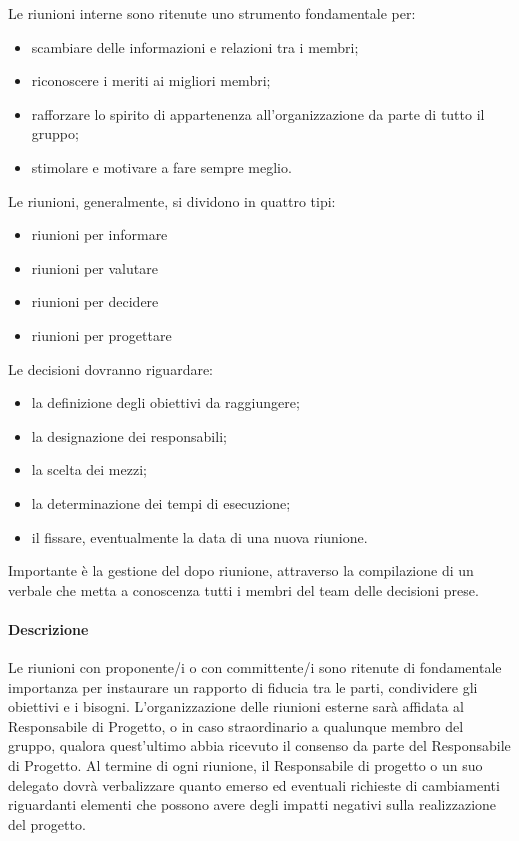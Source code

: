 Le riunioni interne sono ritenute uno strumento fondamentale per:
\begin{itemize}
\item
scambiare delle informazioni e relazioni tra i membri;
\item
riconoscere  i  meriti  ai  migliori membri;
\item
rafforzare lo spirito di appartenenza all'organizzazione da parte di tutto il gruppo;
\item
stimolare e motivare a fare sempre meglio.
\end{itemize}

Le riunioni, generalmente, si dividono in quattro tipi:
\begin{itemize}
\item
riunioni per informare
\item 
riunioni per valutare
\item
riunioni per decidere
\item 
riunioni per progettare 
\end{itemize}

Le decisioni dovranno riguardare:
\begin{itemize}
\item
la definizione degli obiettivi da raggiungere;
\item 
la designazione dei responsabili;
\item
la scelta dei mezzi;
\item
la determinazione dei tempi di esecuzione;
\item
il fissare, eventualmente la data di una nuova riunione.
\end{itemize}

Importante è la gestione del dopo riunione, attraverso la compilazione di un verbale che metta a conoscenza tutti i membri del team delle decisioni prese.

\paragraph{Descrizione}
Le riunioni con proponente/i o con committente/i sono ritenute di fondamentale importanza per instaurare un rapporto di fiducia tra le parti, condividere gli obiettivi e i bisogni.
L'organizzazione delle riunioni esterne sarà affidata al Responsabile di Progetto, o in caso straordinario a qualunque membro del gruppo, qualora quest'ultimo abbia ricevuto il consenso da parte del Responsabile di Progetto.
Al termine di ogni riunione, il Responsabile di progetto o un suo delegato dovrà verbalizzare quanto emerso ed eventuali richieste di cambiamenti riguardanti elementi che possono avere degli impatti negativi sulla realizzazione del progetto.

